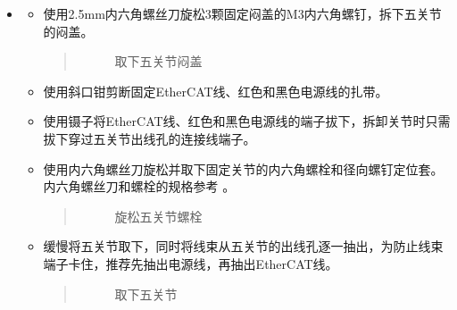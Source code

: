 \documentclass[a4paper,11pt,english,openany,oneside]{sphinxmanual}
\begin{document}
\begin{itemize}
\begin{itemize}
\end{itemize}

\item {} 
\sphinxAtStartPar
{}
\begin{itemize}
\item {} 
\sphinxAtStartPar
使用2.5mm内六角螺丝刀旋松3颗固定闷盖的M3内六角螺钉，拆下五关节的闷盖。
\begin{quote}

\begin{figure}[H]
\centering
\capstart

\noindent{}
\caption{取下五关节闷盖}\label{\detokenize{_u66f4_u6362_u5173_u8282:id75}}\end{figure}
\end{quote}

\item {} 
\sphinxAtStartPar
使用斜口钳剪断固定EtherCAT线、红色和黑色电源线的扎带。

\item {} 
\sphinxAtStartPar
使用镊子将EtherCAT线、红色和黑色电源线的端子拔下，拆卸关节时只需拔下穿过五关节出线孔的连接线端子。

\item {} 
\sphinxAtStartPar
使用内六角螺丝刀旋松并取下固定关节的内六角螺栓和径向螺钉定位套。内六角螺丝刀和螺栓的规格参考 {\hyperref[\detokenize{_u66f4_u6362_u5173_u8282:id9}]{}} 。
\begin{quote}

\begin{figure}[H]
\centering
\capstart

\noindent{}
\caption{旋松五关节螺栓}\label{\detokenize{_u66f4_u6362_u5173_u8282:id76}}\end{figure}
\end{quote}

\item {} 
\sphinxAtStartPar
缓慢将五关节取下，同时将线束从五关节的出线孔逐一抽出，为防止线束端子卡住，推荐先抽出电源线，再抽出EtherCAT线。
\begin{quote}

\begin{figure}[H]
\centering
\capstart

\noindent{}
\caption{取下五关节}\label{\detokenize{_u66f4_u6362_u5173_u8282:id77}}\end{figure}
\end{quote}


\end{itemize}
\end{itemize}
\end{document}
